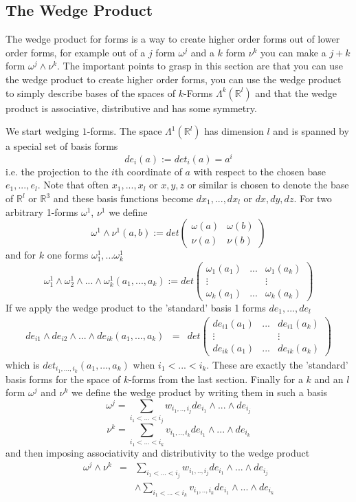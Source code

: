 \subsection{The Wedge Product}
The wedge product for forms is a way to create higher order forms out of lower order forms, for example out of a $j$ form $\omega^j$ and a $k$ form $\nu^k$ you can make a $j+k$ form $\omega^j\wedge \nu^k$. The important points to grasp in this section are that you can use the wedge product to create higher order forms, you can use the wedge product to simply describe bases of the spaces of $k$-Forms $\Lambda^k(\mathbb R^l)$ and that the wedge product is associative, distributive and has some symmetry. 

We start wedging $1$-forms. The space $\Lambda^1(\mathbb R^l)$ has dimension $l$ and is spanned by a special set of basis forms
\[de_i(a) := det_i(a) = a^i\]
i.e. the projection to the $i$th coordinate of $a$ with respect to the chosen base $e_1,...,e_l$. Note that often $x_1,...,x_l$ or $x,y,z$ or similar is chosen to denote the base of $\mathbb R^l$ or $\mathbb R^3$ and these basis functions become $dx_1,..., dx_l$ or $dx,dy,dz$. For two arbitrary 1-forms $\omega^1$, $\nu^1$ we define
\[\omega^1\wedge\nu^1(a,b):= det \begin{pmatrix}
\omega(a) & \omega(b) \\
\nu(a) & \nu(b)
\end{pmatrix}\]
and for $k$ one forms $\omega_1^1,...\omega_k^1$
\[\omega_1^1\wedge\omega_2^1 \wedge...\wedge\omega^1_k(a_1,...,a_k):= det \begin{pmatrix}
\omega_1(a_1) &  ... & \omega_1(a_k) \\
\vdots & & \vdots \\
\omega_k(a_1) &... & \omega_k(a_k)
\end{pmatrix}\]
If we apply the wedge product to the 'standard' basis 1 forms $de_1,..., de_l$ 
\begin{eqnarray*}de_{i1}\wedge de_{i2} \wedge ... \wedge de_{ik}(a_1,...,a_k) &= &det \begin{pmatrix}
de_{i1}(a_1) &  ... & de_{i1}(a_k) \\
\vdots & & \vdots \\
de_{ik}(a_1) &... & de_{ik}(a_k)
\end{pmatrix} \end{eqnarray*}
which is $det_{i_1,...,i_k}(a_1,...,a_k)$ when $i_1 <...<i_k$. These are exactly the 'standard' basis forms for the space of $k$-forms from the last section. Finally for a $k$ and an $l$ form $\omega^j$ and $\nu^k$ we define the wedge product by writing them in such a basis
\[\omega^j = \sum_{i_1<...<i_j} w_{i_1,..,i_j} de_{i_1}\wedge...\wedge de_{i_j} \]
\[\nu^k = \sum_{i_1<...<i_k} v_{i_1,..,i_k} de_{i_1}\wedge...\wedge de_{i_k} \]
and then imposing associativity and distributivity to the wedge product
\begin{eqnarray*}
\omega^j\wedge \nu^k &=& \sum_{i_1<...<i_j} w_{i_1,..,i_j} de_{i_1}\wedge...\wedge de_{i_j} \\
& & \wedge \sum_{i_1<...<i_k} v_{i_1,..,i_k} de_{i_1}\wedge...\wedge de_{i_k} 
\end{eqnarray*}

